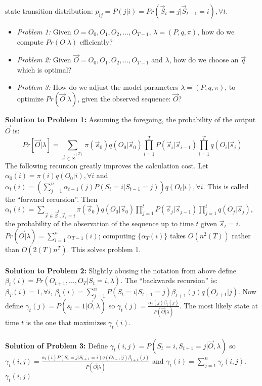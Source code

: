 state transition distribution: 
$p_{ij}=P(j|i)= Pr({\vec S}_t=j | {\vec S}_{t-1}= i), \forall t$.
\begin {itemize}
\item \emph{Problem 1:} Given
$O= O_0, O_1, O_2, ..., O_{T-1}$, $\lambda=(P, q, \pi)$, how do we compute $Pr(O| \lambda)$
efficiently?
\item \emph{Problem 2:} Given
${\vec O}= O_0, O_1, O_2, ..., O_{T-1}$ and $\lambda$, how do we choose an
${\vec q}$ which is optimal?
\item \emph{Problem 3:} How do we adjust the model parameters $\lambda=(P, q, \pi)$, 
to optimize $Pr({\vec O} | \lambda)$, given the observed sequence: ${\vec O}$?
\end {itemize}
{\bf Solution to Problem 1:}
Assuming the foregoing, the probability of the output ${\vec O}$ is:
$$
Pr[{\vec O} | \lambda] = 
\sum_{{\vec s} \in {\vec S}^{(T)}}
\pi({\vec s}_0) q(O_0 | {\vec s}_0)
\prod_{i=1}^T P({\vec s}_{i}|{\vec s}_{i-1}) 
\prod_{i=1}^T q(O_{i}|{\vec s}_{i})
$$
The following recursion greatly improves the calculation cost.
Let $\alpha_0(i)= \pi(i) q(O_0 | i), \forall i$ and 
$\alpha_t(i)= (\sum_{j=1}^n \alpha_{t-1} (j) P(S_t=i | S_{t-1}=j)) q(O_t|i), \forall i$.
This is called the ``forward recursion''.
Then $\alpha_t(i) =
\sum_{{\vec s} \in {\vec S}^t, {\vec s}_t=i}
\pi({\vec s}_0) q(O_0 | {\vec s}_0)
\prod_{j=1}^t P({\vec s}_{j}|{\vec s}_{j-1}) 
\prod_{j=1}^t q(O_{j}|{\vec s}_{j})$,
the probability of the observation of
the sequence up to time $t$ given ${\vec s}_t=i$.
$Pr({\vec O} | \lambda) = \sum_{i=1}^n \alpha_{T-1}(i)$;
computing $\{ \alpha_T(i) \}$ takes 
$O(n^2(T))$ rather than $O(2(T)n^{T})$.  This solves problem 1.
\\
\\
{\bf Solution to Problem 2:}
Slightly abusing the notation from above define
$\beta_t(i) = Pr(O_{t+1}, \ldots, O_T | S_t=i, \lambda)$.  The ``backwards
recursion'' is: $\beta_T(i)=1, \forall i$, 
$\beta_t(i)= \sum_{j=1}^n P(S_t=i|S_{t+1}=j) \beta_{t+1}(j)q(O_{t+1}|j)$.
Now define 
$\gamma_t(j)=P(s_t=1| {\vec O}, \lambda)$ so
$\gamma_t(j)= {\frac {\alpha_t(j) \beta_t(j)} {P({\vec O}| \lambda)}}$.  
The most likely state at time $t$ is the one that maximizes
$\gamma_t(i)$.
\\
\\
{\bf Solution of Problem 3:}
Define $\gamma_t(i,j)= P(S_t=i, S_{t+1}=j| {\vec O}, \lambda)$ so
$\gamma_t(i,j)= {\frac {\alpha_t(i) P(S_t=j | S_{t+1}=i) q(O_{t+1}|j) \beta_{t+1}(j)}
{P({\vec O} | \lambda)}}$ and $\gamma_t(i)= \sum_{j=1}^n \gamma_t(i,j)$.  $\gamma_t(i,j)$
